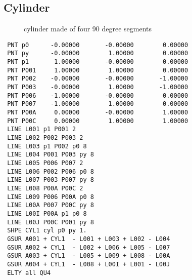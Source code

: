 \documentclass{article}
\begin{document}
\begin{appendix}
\subsection{\label{Cylinder}Cylinder}
\begin{figure}[h]
\caption{\label{cylinder made of four 90 degree segments}cylinder made of four 90 degree segments}
\end{figure}
\begin{verbatim}
 PNT p0      -0.00000       -0.00000        0.00000 
 PNT py      -0.00000        1.00000        0.00000 
 PNT p1       1.00000       -0.00000        0.00000 
 PNT P001     1.00000        1.00000        0.00000 
 PNT P002    -0.00000       -0.00000       -1.00000 
 PNT P003    -0.00000        1.00000       -1.00000 
 PNT P006    -1.00000       -0.00000        0.00000 
 PNT P007    -1.00000        1.00000        0.00000 
 PNT P00A     0.00000       -0.00000        1.00000 
 PNT P00C     0.00000        1.00000        1.00000 
 LINE L001 p1 P001 2              
 LINE L002 P002 P003 2              
 LINE L003 p1 P002 p0 8              
 LINE L004 P001 P003 py 8              
 LINE L005 P006 P007 2              
 LINE L006 P002 P006 p0 8              
 LINE L007 P003 P007 py 8              
 LINE L008 P00A P00C 2              
 LINE L009 P006 P00A p0 8              
 LINE L00A P007 P00C py 8              
 LINE L00I P00A p1 p0 8              
 LINE L00J P00C P001 py 8              
 SHPE CYL1 cyl p0 py 1.
 GSUR A001 + CYL1  - L001 + L003 + L002 - L004 
 GSUR A002 + CYL1  - L002 + L006 + L005 - L007 
 GSUR A003 + CYL1  - L005 + L009 + L008 - L00A 
 GSUR A004 + CYL1  - L008 + L00I + L001 - L00J 
 ELTY all QU4 
\end{verbatim}


\end{appendix}
\end{document}
